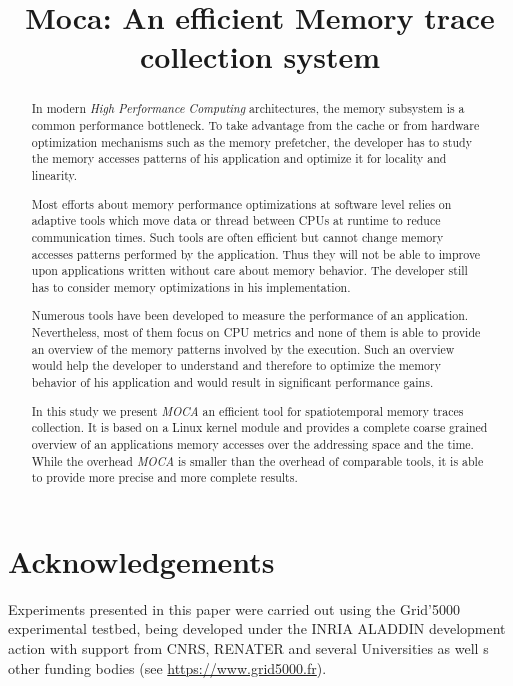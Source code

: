 \documentclass[10pt, conference, compsocconf]{sty/IEEEtran}
\title{Moca: An efficient Memory trace collection system}
\author{\IEEEauthorblockN{David Beniamine, Guillaume Huard}
\IEEEauthorblockA{Univ. Grenoble Alpes, LIG, F-38000 Grenoble, France\\
CNRS, LIG, F-38000 Grenoble, France\\
Inria\\
\{David.Beniamine,Guillaume.Huard\}@Imag.fr}
}
\newcommand{\Input}[1]{}
\newcommand{\Moca}{\emph{MOCA}\xspace}
\begin{document}
\maketitle

\begin{abstract}
    In modern \emph{High Performance Computing} architectures, the memory subsystem
    is a common performance bottleneck. To take advantage from the cache or from hardware optimization mechanisms
    such as the memory prefetcher, the developer has to study the memory accesses
    patterns of his application and optimize it for locality and linearity.

    Most efforts about memory performance optimizations at software level relies
    on adaptive tools which move data or thread between CPUs at runtime to
    reduce communication times. Such tools are often efficient but cannot
    change memory accesses patterns performed by the application. Thus they will not
    be able to improve upon applications written without care about memory behavior.
    The developer still has to consider memory optimizations in his implementation.

    Numerous tools have been developed to measure the performance of an application.
    Nevertheless, most of them focus on CPU metrics and none of them is able to
    provide an overview of the memory patterns involved by the execution. Such an overview would help the
    developer to understand and therefore to optimize the memory
    behavior of his application and would result in significant performance gains.

    In this study we present \Moca an efficient tool for spatiotemporal memory traces collection.
    It is based on a Linux kernel module and provides a complete coarse grained overview
    of an applications memory accesses over the addressing space and the time. While the
    overhead \Moca is smaller than the overhead of comparable tools, it is able to provide
    more precise and more complete results.

\end{abstract}

\Input{intro.tex}
\Input{related.tex}
\Input{design.tex}
\Input{experiment.tex}
\Input{cncl.tex}
\section*{Acknowledgements}
Experiments presented in this paper were carried out using the Grid'5000
experimental testbed, being developed under the INRIA ALADDIN development
action with support from CNRS, RENATER and several Universities as well
s other funding bodies (see \url{https://www.grid5000.fr}).


\balance

\end{document}

